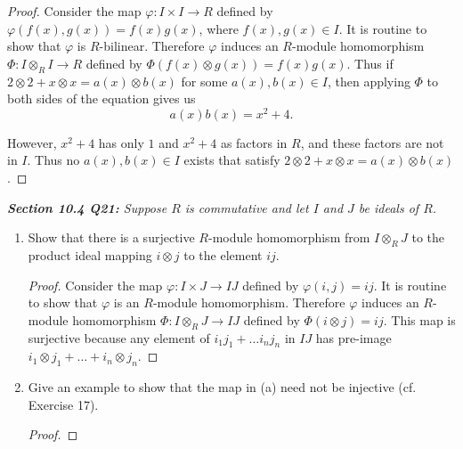\documentclass{article}
\begin{document}
  \begin{proof}
    Consider the map $\varphi:I\times I\rightarrow R$ defined by
    $\varphi(f(x),g(x))=f(x)g(x)$, where $f(x),g(x)\in I$. It is
    routine to show that $\varphi$ is $R$-bilinear. Therefore $\varphi$
    induces an $R$-module homomorphism $\Phi:I\otimes_RI\rightarrow R$
    defined by $\Phi(f(x)\otimes g(x))=f(x)g(x)$. Thus if
    $2\otimes2+x\otimes x=a(x)\otimes b(x)$ for some
    $a(x),b(x)\in I$, then applying $\Phi$ to both sides of the equation
    gives us
    \[a(x)b(x)=x^2+4.\]

    However, $x^2+4$ has only $1$ and $x^2+4$ as factors in $R$, and these
    factors are not in $I$. Thus no $a(x),b(x)\in I$ exists that satisfy
    $2\otimes2+x\otimes x=a(x)\otimes b(x)$.
  \end{proof}

\it \textbf{Section 10.4 Q21:} Suppose $R$ is commutative and let $I$ and
  $J$ be ideals of $R$.
  \begin{enumerate}[label={(\alph*)}]
    \item Show that there is a surjective $R$-module homomorphism from
      $I\otimes_RJ$ to the product ideal mapping $i\otimes j$ to the
      element $ij$.

      \begin{proof}
        Consider the map $\varphi:I\times J\rightarrow IJ$ defined by
        $\varphi(i,j)=ij$. It is routine to show that $\varphi$ is an
        $R$-module homomorphism. Therefore $\varphi$ induces an $R$-module
        homomorphism $\Phi:I\otimes_RJ\rightarrow IJ$ defined by
        $\Phi(i\otimes j)=ij$. This map is surjective because any element
        of $i_1j_1+\ldots i_nj_n$ in $IJ$ has pre-image $i_1\otimes
        j_1+\ldots+i_n\otimes j_n$.
      \end{proof}

    \item Give an example to show that the map in (a) need not be
      injective (cf. Exercise 17).

      \begin{proof}
      \end{proof}
  \end{enumerate}
\end{document}
